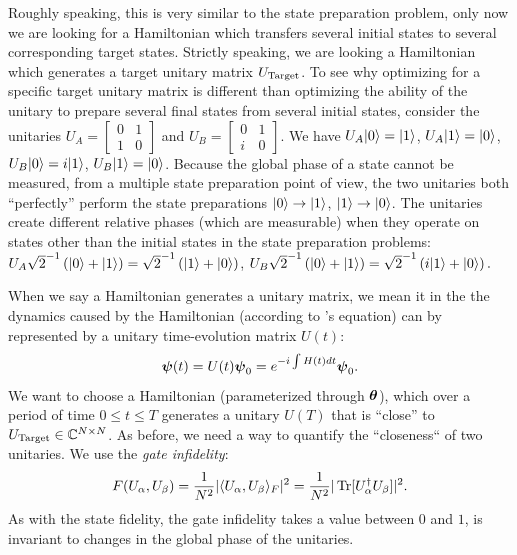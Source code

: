 \documentclass[letterpaper]{tufte-handout}
\begin{document}
Roughly speaking, this is very similar to the state preparation problem, only now we are looking for a Hamiltonian which transfers several initial states to several corresponding target states. Strictly speaking, we are looking a Hamiltonian which generates a target unitary matrix $U_{\textrm{Target}}$. To see why optimizing for  a specific target unitary matrix is different than optimizing the ability of the unitary to prepare several final states from several initial states, consider the unitaries $U_A = \left[\begin{smallmatrix} 0 & 1 \\ 1 & 0 \end{smallmatrix}\right]$ and $U_B = \left[\begin{smallmatrix} 0 & 1 \\ i & 0 \end{smallmatrix}\right]$. We have $U_A |0\rangle = |1\rangle$, $U_A|1\rangle=|0\rangle$, $U_B|0\rangle=i|1\rangle$, $U_B|1\rangle=|0\rangle$. Because the global phase of a state cannot be measured, from a multiple state preparation point of view, the two unitaries both ``perfectly'' perform the state preparations $|0\rangle \rightarrow |1\rangle$, $|1\rangle \rightarrow |0\rangle$. The unitaries create different relative phases (which are measurable) when they operate on states other than the initial states in the state preparation problems: $U_A\sqrt{2}^{-1}\left(|0\rangle+|1\rangle\right)=\sqrt{2}^{-1}\left(|1\rangle+|0\rangle\right)$, $U_B\sqrt{2}^{-1}\left(|0\rangle+|1\rangle\right)=\sqrt{2}^{-1}\left(i|1\rangle+|0\rangle\right).$

When we say a Hamiltonian generates a unitary matrix, we mean it in the the dynamics caused by the Hamiltonian (according to \Schrodinger's equation) can by represented by a unitary time-evolution matrix $U(t)$:
\begin{equation*}
    \boldsymbol{\psi}(t) = U(t)\boldsymbol{\psi}_0 = e^{-i\int H(t)dt}\boldsymbol{\psi}_0.
\end{equation*}
We want to choose a Hamiltonian (parameterized through $\boldsymbol{\theta}$), which over a period of time $0 \leq t \leq T$ generates a unitary $U(T)$ that is ``close'' to $U_{\textrm{Target}} \in \mathbb{C}^{N \times N}$. As before, we need a way to quantify the ``closeness`` of two unitaries. We use the \emph{gate infidelity}: 
\begin{equation}
F(U_\alpha, U_\beta) = \frac{1}{N^2}|\langle U_\alpha,U_\beta\rangle_F|^2 = \frac{1}{N^2}|\operatorname{Tr}[U_\alpha^\dagger U_\beta]|^2.
\end{equation}
As with the state fidelity, the gate infidelity takes a value between $0$ and $1$, is invariant to changes in the global phase of the unitaries.
\end{document}
